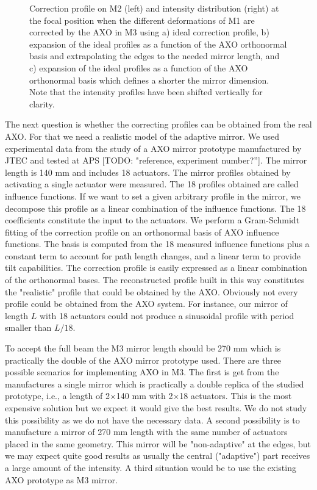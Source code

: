 \documentclass{iucr}              %
\newcommand{\todo}[1]{{\color{red}[TODO: "#1'']}}
\newcommand{\inred}[1]{{\color{red}#1}}
\begin{document}
\begin{figure}
\begin{center}
\begin{tabular}{l}
   \end{tabular}
   \end{center}
   \caption
   { \label{fig:intensitycorrected} 
Correction profile on M2 (left) and intensity distribution (right) at the focal position when the different deformations of M1 are corrected by the AXO in M3 using  a) ideal correction profile, b)  expansion of the ideal profiles as a function of the AXO orthonormal basis and extrapolating the edges to the needed mirror length, and c)  expansion of the ideal profiles as a function of the AXO orthonormal basis which defines a shorter the mirror dimension. Note that the intensity profiles have been shifted vertically for clarity. }
   \end{figure} 


The next question is whether the correcting profiles can be obtained from the real AXO. For that we need a realistic model of the adaptive mirror.
We used experimental data from the study of a AXO mirror prototype manufactured by JTEC and tested at APS \todo{reference, experiment number?}. The mirror length is \inred{140 mm} and includes 18 actuators. The mirror profiles obtained by activating a single actuator were measured. The 18 profiles obtained are called influence functions. If we want to set a given arbitrary  profile in the mirror, we decompose this profile as a linear combination of the influence functions. The 18 coefficients constitute the input to the actuators.  
We perform a Gram-Schmidt fitting of the correction profile on an orthonormal basis of AXO influence functions. The basis is computed from the 18 measured influence functions plus a constant term to account for path length changes, and a linear term to provide tilt capabilities. The correction profile is easily expressed as a linear combination of the orthonormal bases. The reconstructed profile built in this way constitutes the "realistic" profile that could be obtained by the AXO. Obviously not every profile could be obtained from the AXO system. For instance, our mirror of length $L$ with 18 actuators could not produce a sinusoidal profile with period smaller than $L/18$. 

To accept the full beam the M3 mirror length should be 270 mm which is practically the double of the AXO mirror prototype used. There are three possible scenarios for implementing AXO in M3. The first is get from the manufactures a single mirror which is practically a double replica of the studied prototype, i.e., a length of 2$\times$140 mm with 2$\times$18 actuators. This is the most expensive solution but we expect it would give the best results. We do not study this possibility as we do not have the necessary data. A second possibility is to manufacture a mirror of 270 mm length with the same number of actuators placed in the same geometry. This mirror will be "non-adaptive" at the edges, but we may expect quite good results as usually the central ("adaptive") part receives a large amount of the intensity. A third situation would be to use the existing AXO prototype as M3 mirror.  
\end{document}
